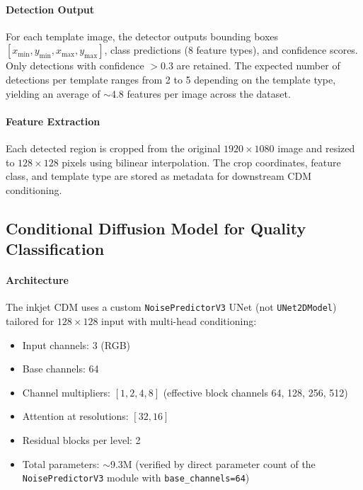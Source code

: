 \paragraph{Detection Output}

For each template image, the detector outputs bounding boxes $[x_{\min}, y_{\min}, x_{\max}, y_{\max}]$, class predictions (8 feature types), and confidence scores. Only detections with confidence $> 0.3$ are retained. The expected number of detections per template ranges from 2 to 5 depending on the template type, yielding an average of $\sim$4.8 features per image across the dataset.

\paragraph{Feature Extraction}

Each detected region is cropped from the original $1920 \times 1080$ image and resized to $128 \times 128$ pixels using bilinear interpolation. The crop coordinates, feature class, and template type are stored as metadata for downstream CDM conditioning.


\subsection{Conditional Diffusion Model for Quality Classification}
\label{sec:impl:inkjet_cdm}

\paragraph{Architecture}

The inkjet CDM uses a custom \texttt{NoisePredictorV3} UNet (not \texttt{UNet2DModel}) tailored for $128 \times 128$ input with multi-head conditioning:
\begin{itemize}
\item Input channels: 3 (RGB)
\item Base channels: 64
\item Channel multipliers: $[1, 2, 4, 8]$ (effective block channels 64, 128, 256, 512)
\item Attention at resolutions: $[32, 16]$
\item Residual blocks per level: 2
\item Total parameters: $\sim$9.3M (verified by direct parameter count of the \texttt{NoisePredictorV3} module with \texttt{base\_channels=64})
\end{itemize}

